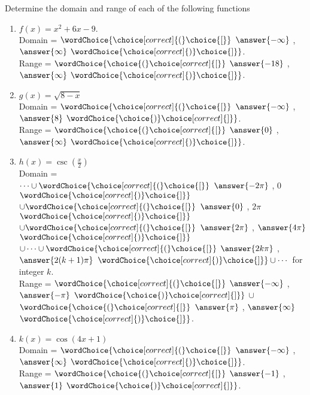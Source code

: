 \documentclass{ximera}
\author{Elizabeth Campolongo}
\begin{document}
\begin{exercise}
Determine the domain and range of each of the following functions
%
\begin{enumerate}

\item $f(x) = x^2+6x-9.$\\
Domain = $\wordChoice{\choice[correct]{(}\choice{[}}$ $\answer{-\infty}$ , $\answer{\infty}$ $\wordChoice{\choice[correct]{)}\choice{]}}$.\\
Range = $\wordChoice{\choice{(}\choice[correct]{[}}$ $\answer{-18}$ , $\answer{\infty}$ $\wordChoice{\choice[correct]{)}\choice{]}}$.


\item $g(x) = \sqrt{8-x} $\\
Domain = $\wordChoice{\choice[correct]{(}\choice{[}}$ $\answer{-\infty}$ , $\answer{8}$ $\wordChoice{\choice{)}\choice[correct]{]}}$.\\
Range = $\wordChoice{\choice{(}\choice[correct]{[}}$ $\answer{0}$ , $\answer{\infty}$ $\wordChoice{\choice[correct]{)}\choice{]}}$.


\item $h(x) = \csc\!\left(\frac{x}{2}\right)$\\
Domain = \\
$\cdots \cup
\wordChoice{\choice[correct]{(}\choice{[}}$ $\answer{-2\pi}$ , 0 $\wordChoice{\choice[correct]{)}\choice{]}}$ 
$\cup 
\wordChoice{\choice[correct]{(}\choice{[}}$ $\answer{0}$ , $2\pi$ $\wordChoice{\choice[correct]{)}\choice{]}}$ 
$\cup 
\wordChoice{\choice[correct]{(}\choice{[}}$ $\answer{2\pi}$ , $\answer{4\pi}$ $\wordChoice{\choice[correct]{)}\choice{]}}$ 
$\cup \cdots \cup
\wordChoice{\choice[correct]{(}\choice{[}}$ $\answer{2k\pi}$ , $\answer{2(k+1)\pi}$ $\wordChoice{\choice[correct]{)}\choice{]}}
\cup \cdots$ for integer $k$.
\\
Range = $\wordChoice{\choice[correct]{(}\choice{[}}$ 
$\answer{-\infty}$ , $\answer{-\pi}$ 
$\wordChoice{\choice{)}\choice[correct]{]}}$ 
$\cup$  
$\wordChoice{\choice{(}\choice[correct]{[}}$ 
$\answer{\pi}$ , $\answer{\infty}$ 
$\wordChoice{\choice[correct]{)}\choice{]}}$.

\item $k(x) = \cos(4x+1)$ \\
Domain = $\wordChoice{\choice[correct]{(}\choice{[}}$ 
$\answer{-\infty}$ , $\answer{\infty}$ 
$\wordChoice{\choice[correct]{)}\choice{]}}$.\\
Range = $\wordChoice{\choice{(}\choice[correct]{[}}$ $\answer{-1}$ , $\answer{1}$ $\wordChoice{\choice{)}\choice[correct]{]}}$.



\end{enumerate}
\end{exercise}
\end{document}
